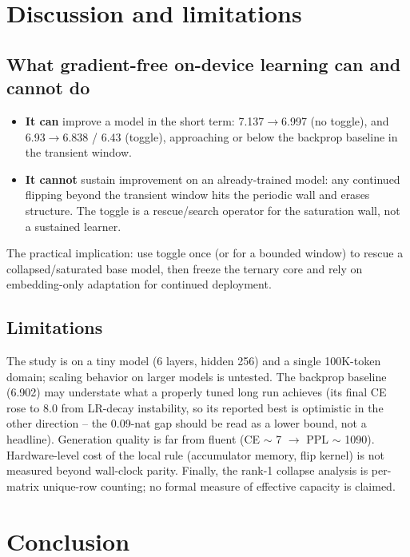 \documentclass{article} %
\begin{document}
\section{Discussion and limitations}
\label{sec:discussion}

\subsection{What gradient-free on-device learning can and cannot do}
\label{sec:can}
\begin{itemize}
\item \textbf{It can} improve a model in the short term: 7.137$\rightarrow$6.997 (no toggle), and 6.93$\rightarrow$6.838 / 6.43 (toggle), approaching or below the backprop baseline in the transient window.
\item \textbf{It cannot} sustain improvement on an already-trained model: any continued flipping beyond the transient window hits the periodic wall and erases structure. The toggle is a rescue/search operator for the saturation wall, not a sustained learner.
\end{itemize}

The practical implication: use toggle once (or for a bounded window) to rescue a collapsed/saturated base model, then freeze the ternary core and rely on embedding-only adaptation for continued deployment.

\subsection{Limitations}
\label{sec:limitations}
The study is on a tiny model (6 layers, hidden 256) and a single 100K-token domain; scaling behavior on larger models is untested. The backprop baseline (6.902) may understate what a properly tuned long run achieves (its final CE rose to 8.0 from LR-decay instability, so its reported best is optimistic in the other direction -- the 0.09-nat gap should be read as a lower bound, not a headline). Generation quality is far from fluent (CE $\sim$ 7 $\rightarrow$ PPL $\sim$ 1090). Hardware-level cost of the local rule (accumulator memory, flip kernel) is not measured beyond wall-clock parity. Finally, the rank-1 collapse analysis is per-matrix unique-row counting; no formal measure of effective capacity is claimed.

\section{Conclusion}
\label{sec:conclusion}
\end{document}
